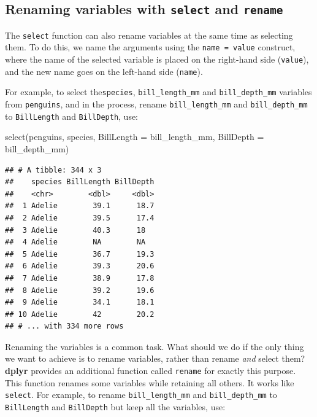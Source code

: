 \documentclass[
]{book}
\newenvironment{Shaded}{\begin{snugshade}}{\end{snugshade}}
\newcommand{\AttributeTok}[1]{\textcolor[rgb]{0.77,0.63,0.00}{#1}}
\newcommand{\FunctionTok}[1]{\textcolor[rgb]{0.00,0.00,0.00}{#1}}
\newcommand{\NormalTok}[1]{#1}
\begin{document}
\hypertarget{renaming-variables-with-select-and-rename}{%
\subsection{\texorpdfstring{Renaming variables with \texttt{select} and \texttt{rename}}{Renaming variables with select and rename}}\label{renaming-variables-with-select-and-rename}}

The \texttt{select} function can also rename variables at the same time as selecting them. To do this, we name the arguments using the \texttt{name\ =\ value} construct, where the name of the selected variable is placed on the right-hand side (\texttt{value}), and the new name goes on the left-hand side (\texttt{name}).

For example, to select the\texttt{species}, \texttt{bill\_length\_mm} and \texttt{bill\_depth\_mm} variables from \texttt{penguins}, and in the process, rename \texttt{bill\_length\_mm} and \texttt{bill\_depth\_mm} to \texttt{BillLength} and \texttt{BillDepth}, use:

\begin{Shaded}
\begin{Highlighting}[]
\FunctionTok{select}\NormalTok{(penguins, species, }\AttributeTok{BillLength =}\NormalTok{ bill\_length\_mm, }\AttributeTok{BillDepth =}\NormalTok{ bill\_depth\_mm)}
\end{Highlighting}
\end{Shaded}

\begin{verbatim}
## # A tibble: 344 x 3
##    species BillLength BillDepth
##    <chr>        <dbl>     <dbl>
##  1 Adelie        39.1      18.7
##  2 Adelie        39.5      17.4
##  3 Adelie        40.3      18  
##  4 Adelie        NA        NA  
##  5 Adelie        36.7      19.3
##  6 Adelie        39.3      20.6
##  7 Adelie        38.9      17.8
##  8 Adelie        39.2      19.6
##  9 Adelie        34.1      18.1
## 10 Adelie        42        20.2
## # ... with 334 more rows
\end{verbatim}

Renaming the variables is a common task. What should we do if the only thing we want to achieve is to rename variables, rather than rename \emph{and} select them? \textbf{dplyr} provides an additional function called \texttt{rename} for exactly this purpose. This function renames some variables while retaining all others. It works like \texttt{select}. For example, to rename \texttt{bill\_length\_mm} and \texttt{bill\_depth\_mm} to \texttt{BillLength} and \texttt{BillDepth} but keep all the variables, use:
\end{document}
